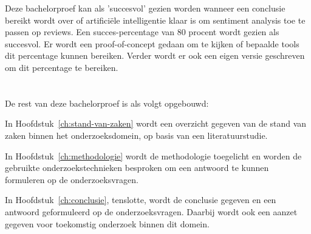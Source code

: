Deze bachelorproef kan als 'succesvol' gezien worden wanneer een conclusie bereikt wordt over of artificiële intelligentie klaar is om sentiment analysis toe te passen op reviews. Een succes-percentage van 80 procent wordt gezien als succesvol. Er wordt een proof-of-concept gedaan om te kijken of bepaalde tools dit percentage kunnen bereiken. Verder wordt er ook een eigen versie geschreven om dit percentage te bereiken.

\section{}
\label{sec:opzet-bachelorproef}


De rest van deze bachelorproef is als volgt opgebouwd:

In Hoofdstuk~\ref{ch:stand-van-zaken} wordt een overzicht gegeven van de stand van zaken binnen het onderzoeksdomein, op basis van een literatuurstudie.

In Hoofdstuk~\ref{ch:methodologie} wordt de methodologie toegelicht en worden de gebruikte onderzoekstechnieken besproken om een antwoord te kunnen formuleren op de onderzoeksvragen.


In Hoofdstuk~\ref{ch:conclusie}, tenslotte, wordt de conclusie gegeven en een antwoord geformuleerd op de onderzoeksvragen. Daarbij wordt ook een aanzet gegeven voor toekomstig onderzoek binnen dit domein.